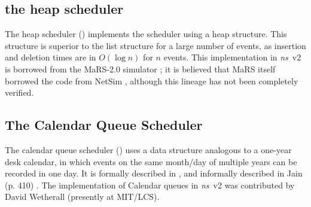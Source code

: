\subsection{the heap scheduler}
\label{sec:heapsched}

The heap scheduler ()
implements the scheduler using a heap structure.
This structure is superior to the list structure for a large number
of events, as insertion and deletion times are in $O(\log n)$
for $n$ events.
This implementation in \emph{ns}~v2 is borrowed from the
MaRS-2.0 simulator \cite{Alae94:Design};
it is believed that MaRS itself borrowed the code
from NetSim \cite{Heyb89:Netsim},
although this lineage has not been completely verified.

\subsection{The Calendar Queue Scheduler}
\label{sec:cqsched}

The calendar queue scheduler
()
uses a data structure analogous to a one-year desk calendar,
in which events on the same month/day of multiple years can be recorded in
one day.
It is formally described in \cite{Brow88:Calendar}, and informally described
in Jain (p. 410) \cite{Jain91:Art}.
The implementation of Calendar queues in \emph{ns}~v2
was contributed by David Wetherall (presently at MIT/LCS).

